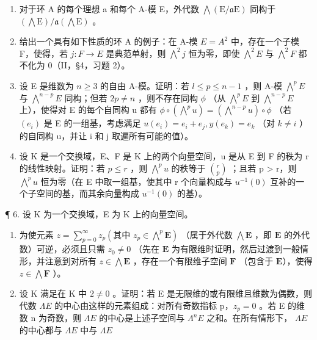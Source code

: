 \begin{enumerate}
\def\labelenumi{\arabic{enumi}.}
\setcounter{enumi}{1}
\item
  对于环 A 的每个理想 a 和每个 A-模 E，外代数 \(\bigwedge(\mathrm{E}/\mathfrak{a}\mathrm{E})\) 同构于 \((\bigwedge\mathrm{E})/\mathfrak{a}(\bigwedge\mathrm{E})\) 。
\item
  给出一个具有如下性质的环 A 的例子：在 A-模 \(E = A^{2}\) 中，存在一个子模 F，使得，若 \(j: F \to E\) 是典范单射，则 \(\bigwedge^{2} j\) 恒为零，即使 \(\bigwedge^{2} E\) 与 \(\bigwedge^{2} F\) 都不化为 0（II，§4，习题 2）。
\item
  设 E 是维数为 \(n \geqslant 3\) 的自由 A-模。证明：若 \(l \leqslant p \leqslant n - 1\) ，则 A-模 \(\bigwedge^{p}E\) 与 \(\bigwedge^{n-p}E\) 同构；但若 \(2p \neq n\) ，则不存在同构 \(\phi\) （从 \(\bigwedge^{p}E\) 到 \(\bigwedge^{n-p}E\) 上），使得对 E 的每个自同构 u 都有 \(\phi \circ \left(\bigwedge^{p}u\right) = \left(\bigwedge^{n-p}u\right) \circ \phi\) （若 \((e_{i})\) 是 E 的一组基，考虑满足 \(u(e_{i}) = e_{i} + e_{j}, y(e_{k}) = e_{k}\) （对 \(k \neq i\) ）的自同构 u，并让 i 和 j 取遍所有可能的值）。
\item
  设 K 是一个交换域，E、F 是 K 上的两个向量空间，u 是从 E 到 F 的秩为 r 的线性映射。证明：若 \(p \leqslant r\) ，则 \(\bigwedge^{p}u\) 的秩等于 \(\binom{r}{p}\) ；且若 p \textgreater{} r，则 \(\bigwedge^{p}u\) 恒为零（在 E 中取一组基，使其中 r 个向量构成与 \(u^{-1}(0)\) 互补的一个子空间的基，而其余向量构成 \(u^{-1}(0)\) 的基）。
\end{enumerate}

¶ 6. 设 K 为一个交换域，E 为 K 上的向量空间。

\begin{enumerate}
\def\labelenumi{(\alph{enumi})}
\item
  为使元素 \(z = \sum_{p=0}^{\infty} z_p \left( \text{其中 } z_p \in \bigwedge^p \mathbf{E} \right)\) （属于外代数 \(\bigwedge \mathbf{E}\) ，即 \(\mathbf{E}\) 的外代数）可逆，必须且只需 \(z_0 \neq 0\) （先在 \(\mathbf{E}\) 为有限维时证明，然后过渡到一般情形，并注意到对所有 \(z \in \bigwedge \mathbf{E}\) ，存在一个有限维子空间 \(\mathbf{F}\) （包含于 \(\mathbf{E}\)），使得 \(z \in \bigwedge \mathbf{F}\) ）。
\item
  设 K 满足在 K 中 \(2 \neq 0\) 。证明：若 E 是无限维的或有限维且维数为偶数，则代数 \(\Lambda E\) 的中心由这样的元素组成：对所有奇数指标 p，\(z_{p} = 0\) 。若 E 的维数 n 为奇数，则 \(\Lambda E\) 的中心是上述子空间与 \(\Lambda^{n}E\) 之和。在所有情形下， \(\Lambda E\) 的中心都与 \(\Lambda E\) 中与 \(\Lambda E\)
\end{enumerate}

